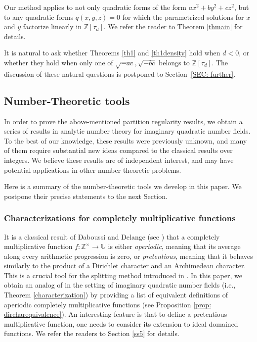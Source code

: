 \documentclass[11pt]{amsart}
\theoremstyle{definition}
\newcommand{\Z}{{\mathbb Z}}
\newcommand{\U}{{\mathbb U}}
\newcommand{\AK}[1]{{\color{ForestGreen}{{#1}}}}
\begin{document}
 
Our method applies to not only quadratic forms of the form $ax^{2}+by^{2}+cz^{2}$, but to any quadratic forms $q(x,y,z)=0$ for which the parametrized solutions for $x$ and $y$ factorize linearly in  $\Z[\tau_{d}]$. We refer the reader to Theorem \ref{thmain} for details.



It is natural to ask whether Theorems \ref{th1} and \ref{th1density} hold when $d<0$, or whether they hold when only one of $\sqrt{-ac}, \sqrt{-bc}$ belongs to $\Z[\tau_{d}]$.
The discussion of these natural questions is postponed to Section~\ref{SEC: further}.



 

\subsection{Number-Theoretic tools} In order to prove the above-mentioned partition regularity results, we obtain a series of results in analytic number theory for imaginary quadratic number fields. To the best of our knowledge, these results were previously unknown, and many of them require substantial new ideas compared to the classical results over integers. We believe these results are of independent interest, and may have potential applications in other number-theoretic problems.

Here is a summary of the number-theoretic tools we develop in this paper. We postpone their precise statements to the next Section.

\subsubsection{Characterizations for completely multiplicative functions}
 It is a classical result of Daboussi and Delange (see \cite[Corollary~1]{daboussidelange82}) that a completely multiplicative function $f\colon \Z^{\times}\to\U$ is either \emph{aperiodic}, meaning that its average along every arithmetic progression is zero, or \emph{pretentious}, meaning that it behaves similarly to the product of a Dirichlet character and an Archimedean character. 
This is a crucial tool for the splitting method introduced in \cite{FKM2,FKM1}.
In this paper, we obtain an analog of \cite[Corollary~1]{daboussidelange82} in the setting of imaginary quadratic number fields (i.e., Theorem \ref{characterization}) by providing a list of equivalent definitions of aperiodic completely multiplicative functions (see Proposition \ref{prop: dircharequivalence}). 
An interesting feature is that to define a pretentious multiplicative function, one needs to consider its extension to ideal domained functions. We refer the readers to Section \ref{ss5} for details.
 
\end{document}
